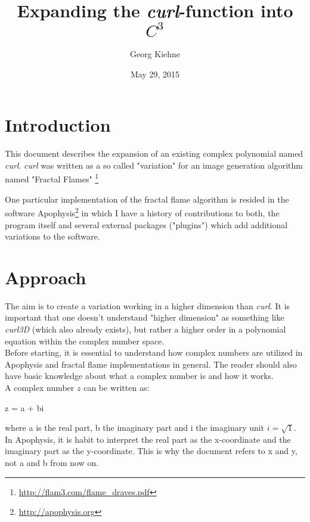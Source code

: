 \documentclass[]{article}
\title{Expanding the \emph{curl}-function into $C^3$}
\author{Georg Kiehne}
\date{May 29, 2015}
\begin{document}
	
\maketitle

\section{Introduction}

\noindent This document describes the expansion of an existing complex polynomial named \emph{curl}. \emph{curl} was written as a so called "variation" for an image generation algorithm named "Fractal Flames" \footnote{\url{http://flam3.com/flame_draves.pdf}}

\noindent One particular implementation of the fractal flame algorithm is resided in the software Apophysis\footnote{\url{http://apophysis.org}} in which I have a history of contributions to both, the program itself and several external packages ("plugins") which add additional variations to the software.

\section{Approach}
	
\noindent The aim is to create a variation working in a higher dimension than \emph{curl}. It is important that one doesn't understand "higher dimension" as something like \emph{curl3D} (which also already exists), but rather a higher order in a polynomial equation within the complex number space. \\

\noindent Before starting, it is essential to understand how complex numbers are utilized in Apophysis and fractal flame implementations in general. The reader should also have basic knowledge about what a complex number is and how it works. \\

\noindent A complex number $z$ can be written as:

\begin{flushleft}
	\hspace{20pt} z = a + bi
\end{flushleft}

\noindent where a is the real part, b the imaginary part and i the imaginary unit $i = \sqrt{1}$. \\

\noindent  In Apophysis, it is habit to interpret the real part as the x-coordinate and the imaginary part as the y-coordinate. This is why the document refers to x and y, not a and b from now on.
\end{document}
